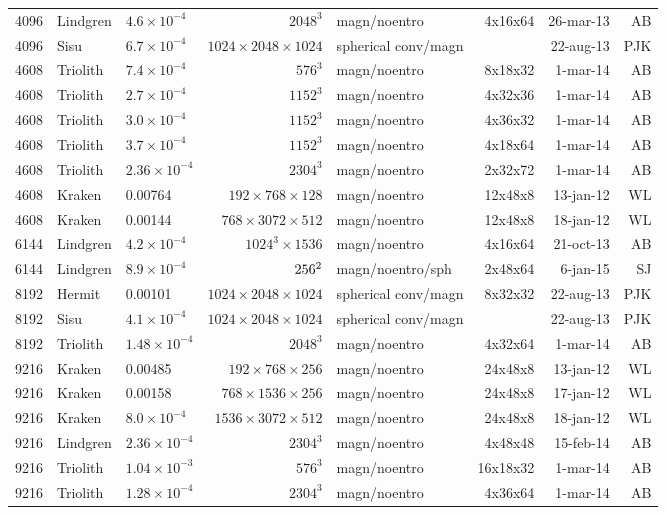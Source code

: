 \documentclass[\mydriver,12pt,twoside,notitlepage,a4paper]{article}
\begin{document}
\begin{center}
\begin{footnotesize}
\begin{longtable}{rllrlrrr}
4096&Lindgren&$4.6{\!\times\!}10^{-4}$&$2048^3$&magn/noentro&4x16x64&26-mar-13&AB\\
4096&Sisu&$6.7{\!\times\!}10^{-4}$&$1024{\!\times\!}2048{\!\times\!}1024$&spherical conv/magn& &22-aug-13&PJK\\
4608&Triolith&$7.4{\!\times\!}10^{-4}$&$ 576^3$&magn/noentro&8x18x32& 1-mar-14 & AB \\
4608&Triolith&$2.7{\!\times\!}10^{-4}$&$1152^3$&magn/noentro&4x32x36& 1-mar-14 & AB \\
4608&Triolith&$3.0{\!\times\!}10^{-4}$&$1152^3$&magn/noentro&4x36x32& 1-mar-14 & AB \\
4608&Triolith&$3.7{\!\times\!}10^{-4}$&$1152^3$&magn/noentro&4x18x64& 1-mar-14 & AB \\
4608&Triolith&$2.36{\!\times\!}10^{-4}$&$2304^3$&magn/noentro&2x32x72& 1-mar-14 & AB \\
4608& Kraken&  0.00764 &$192{\!\times\!}768{\!\times\!}128$ & magn/noentro & 12x48x8 &13-jan-12 & WL\\
4608& Kraken& 0.00144  &$768{\!\times\!}3072{\!\times\!}512$ & magn/noentro & 12x48x8 &18-jan-12 & WL\\
6144&Lindgren&$4.2{\!\times\!}10^{-4}$&$1024^3\times1536$&magn/noentro&4x16x64&21-oct-13&AB\\
6144&Lindgren&$8.9{\!\times\!}10^{-4}$&$256\time1152^2$&magn/noentro/sph&2x48x64&6-jan-15&SJ\\
8192&Hermit&0.00101&$1024{\!\times\!}2048{\!\times\!}1024$&spherical conv/magn&8x32x32&22-aug-13&PJK\\
8192&Sisu&$4.1{\!\times\!}10^{-4}$&$1024{\!\times\!}2048{\!\times\!}1024$&spherical conv/magn& &22-aug-13&PJK\\
8192&Triolith&$1.48{\!\times\!}10^{-4}$&$2048^3$&magn/noentro&4x32x64& 1-mar-14 & AB \\
9216& Kraken&  0.00485 &$192{\!\times\!}768{\!\times\!}256$ & magn/noentro & 24x48x8 &13-jan-12 & WL\\
9216& Kraken& 0.00158   &$768{\!\times\!}1536{\!\times\!}256$ & magn/noentro & 24x48x8 &17-jan-12 & WL\\
9216& Kraken& $8.0{\!\times\!}10^{-4}$  &$1536{\!\times\!}3072{\!\times\!}512$ & magn/noentro & 24x48x8 &18-jan-12 & WL\\
9216&Lindgren&$2.36{\!\times\!}10^{-4}$&$2304^3$&magn/noentro&4x48x48&15-feb-14&AB\\
9216&Triolith&$1.04{\!\times\!}10^{-3}$&$ 576^3$&magn/noentro&16x18x32& 1-mar-14 & AB \\
9216&Triolith&$1.28{\!\times\!}10^{-4}$&$2304^3$&magn/noentro&4x36x64& 1-mar-14 & AB \\

\end{longtable}
\end{footnotesize}
\end{center}
\end{document}
